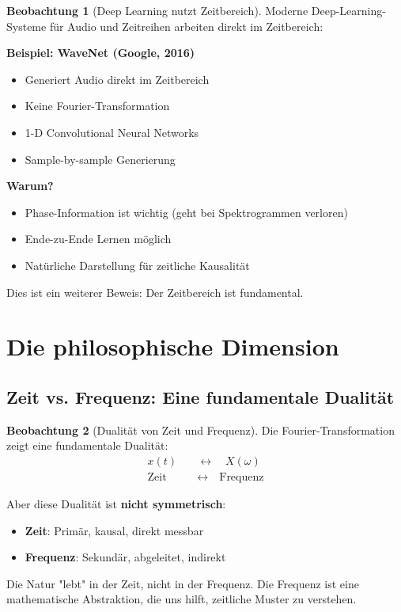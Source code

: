 ﻿\documentclass[a4paper,12pt]{report}
\theoremstyle{definition}
\newtheorem{beobachtung}{Beobachtung}
\begin{document}
	\begin{beobachtung}[Deep Learning nutzt Zeitbereich]
		Moderne Deep-Learning-Systeme für Audio und Zeitreihen arbeiten direkt im Zeitbereich:
		
		\textbf{Beispiel: WaveNet (Google, 2016)}
		\begin{itemize}
			\item[-] Generiert Audio direkt im Zeitbereich
			\item[-] Keine Fourier-Transformation
			\item[-] 1-D Convolutional Neural Networks
			\item[-] Sample-by-sample Generierung
		\end{itemize}
		
		\textbf{Warum?}
		\begin{itemize}
			\item[-] Phase-Information ist wichtig (geht bei Spektrogrammen verloren)
			\item[-] Ende-zu-Ende Lernen möglich
			\item[-] Natürliche Darstellung für zeitliche Kausalität
		\end{itemize}
		
		Dies ist ein weiterer Beweis: Der Zeitbereich ist fundamental.
	\end{beobachtung}
	
	\section{Die philosophische Dimension}
	
	\subsection{Zeit vs. Frequenz: Eine fundamentale Dualität}
	
	\begin{beobachtung}[Dualität von Zeit und Frequenz]
		Die Fourier-Transformation zeigt eine fundamentale Dualität:
		\begin{align}
			x(t) \quad &\leftrightarrow \quad X(\omega) \\
			\text{Zeit} \quad &\leftrightarrow \quad \text{Frequenz}
		\end{align}
		
		Aber diese Dualität ist \textbf{nicht symmetrisch}:
		\begin{itemize}
			\item[-] \textbf{Zeit}: Primär, kausal, direkt messbar
			\item[-] \textbf{Frequenz}: Sekundär, abgeleitet, indirekt
		\end{itemize}
		
		Die Natur "lebt" in der Zeit, nicht in der Frequenz. Die Frequenz ist eine mathematische Abstraktion, die uns hilft, zeitliche Muster zu verstehen.
	\end{beobachtung}
	
\end{document}
